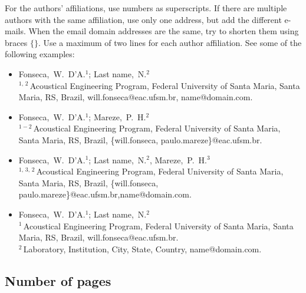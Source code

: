 \documentclass[12pt, a4paper, twoside, twocolumn]{article}
\begin{document}
For the authors' affiliations, use numbers as superscripts. If there are multiple authors with the same affiliation, use only one address, but add the different e-mails. When the email domain addresses are the same, try to shorten them using braces $\{ \}$. Use a maximum of two lines for each author affiliation. See some of the following examples:
%
\begin{flushleft}
\vspace{-0.5\baselineskip}
\begin{itemize}[topsep=-1ex,align=left,leftmargin=0.2cm] \itemsep=4pt

	\item Fonseca,~W.~D'A.$^1$; Last name,~N.$^2$\\[6pt]	
	$^{1,\,2}$\,Acoustical Engineering Program, Federal University of Santa Maria, Santa Maria, RS, Brazil, 
	 will.fonseca@eac.ufsm.br, name@domain.com.
	
	\item Fonseca,~W.~D'A.$^1$; Mareze,~P.~H.$^2$\\[6pt]	
	$^{1-2}$\,Acoustical Engineering Program, Federal University of Santa Maria, Santa Maria, RS, Brazil,
	\{will.fonseca, paulo.mareze\}@eac.ufsm.br.
	
	\item Fonseca,~W.~D'A.$^1$; Last name,~N.$^2$, Mareze,~P.~H.$^3$\\[6pt]	
	$^{1,\,3,\,2}$\,Acoustical Engineering Program, Federal University of Santa Maria, Santa Maria, RS, Brazil,
	\{will.fonseca, paulo.mareze\}@eac.ufsm.br,\linebreak name@domain.com.

	\item Fonseca,~W.~D'A.$^1$; Last name,~N.$^2$\\[6pt]	
	$^{1}$\,Acoustical Engineering Program, Federal University of Santa Maria, Santa Maria, RS, Brazil,
	will.fonseca@eac.ufsm.br.\\[4pt]		
	$^2$\,Laboratory, Institution, City, State, Country, name@domain.com.	
\end{itemize}
\vspace{-0.4\baselineskip}
\end{flushleft}

\subsection{Number of pages}
\end{document}
